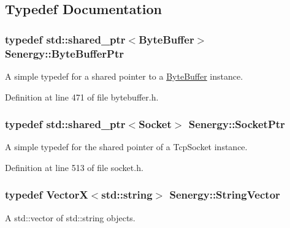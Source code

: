 \subsection{Typedef Documentation}
\hypertarget{namespace_senergy_a30f5cfaeb333ffdf2c3332cc590a57ea}{
\subsubsection[{Byte\-Buffer\-Ptr}]{\setlength{\rightskip}{0pt plus 5cm}typedef std\-::shared\-\_\-ptr$<${\bf Byte\-Buffer}$>$ {\bf Senergy\-::\-Byte\-Buffer\-Ptr}}}\label{namespace_senergy_a30f5cfaeb333ffdf2c3332cc590a57ea}


A simple typedef for a shared pointer to a \hyperlink{class_senergy_1_1_byte_buffer}{Byte\-Buffer} instance. 



Definition at line 471 of file bytebuffer.\-h.

\hypertarget{namespace_senergy_a9014e48a368555ba932efd8d17eb2d23}{
\subsubsection[{Socket\-Ptr}]{\setlength{\rightskip}{0pt plus 5cm}typedef std\-::shared\-\_\-ptr$<${\bf Socket}$>$ {\bf Senergy\-::\-Socket\-Ptr}}}\label{namespace_senergy_a9014e48a368555ba932efd8d17eb2d23}


A simple typedef for the shared pointer of a Tcp\-Socket instance. 



Definition at line 513 of file socket.\-h.

\hypertarget{namespace_senergy_a09aea2e19671645414361ca8388aebfe}{
\subsubsection[{String\-Vector}]{\setlength{\rightskip}{0pt plus 5cm}typedef {\bf Vector\-X}$<$std\-::string$>$ {\bf Senergy\-::\-String\-Vector}}}\label{namespace_senergy_a09aea2e19671645414361ca8388aebfe}


A std\-::vector of std\-::string objects. 



